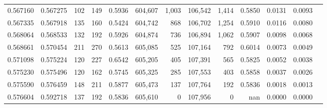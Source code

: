 \begin{tabular}{rrrrrrrrrrrrr}
0.567160 & 0.567275 &   102 &   149 &                                     0.5936 & 604,607 &   1,003 & 106,542 &   1,414 & 0.5850 & 0.0131 & 0.0093 \\
0.567335 & 0.567918 &   135 &   160 &                                     0.5424 & 604,742 &     868 & 106,702 &   1,254 & 0.5910 & 0.0116 & 0.0080 \\
0.568064 & 0.568533 &   132 &   192 &                                     0.5926 & 604,874 &     736 & 106,894 &   1,062 & 0.5907 & 0.0098 & 0.0068 \\
0.568661 & 0.570454 &   211 &   270 &                                     0.5613 & 605,085 &     525 & 107,164 &     792 & 0.6014 & 0.0073 & 0.0049 \\
0.571098 & 0.575224 &   120 &   227 &                                     0.6542 & 605,205 &     405 & 107,391 &     565 & 0.5825 & 0.0052 & 0.0038 \\
0.575230 & 0.575496 &   120 &   162 &                                     0.5745 & 605,325 &     285 & 107,553 &     403 & 0.5858 & 0.0037 & 0.0026 \\
0.575590 & 0.576459 &   148 &   211 &                                     0.5877 & 605,473 &     137 & 107,764 &     192 & 0.5836 & 0.0018 & 0.0013 \\
0.576604 & 0.592718 &   137 &   192 &                                     0.5836 & 605,610 &       0 & 107,956 &       0 &    nan & 0.0000 & 0.0000 \\
\bottomrule
\end{tabular}
